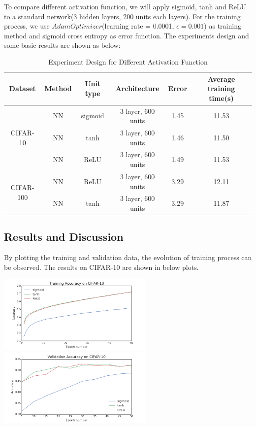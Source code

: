 \documentclass[]{article}
\begin{document}
To compare different activation function, we will apply sigmoid, tanh and ReLU to a standard network(3 hidden layers, 200 units each layers). For the training process, we use $AdamOptimizer$(learning rate = 0.0001, $\epsilon = 0.001$) as training method and sigmoid cross entropy as error function. The experiments design and some basic results are shown as below:
\begin{table}[!ht]
\centering 
\caption{Experiment Design for Different Activation Function}
\begin{tabular}{c c c c c c}
\toprule
Dataset & Method & Unit type & Architecture & Error & Average training time(s)  \\
\midrule
\multirow{3}{*}{CIFAR-10} & NN & sigmoid & 3 layer, 600 units & 1.45 & 11.53   \\
& NN & tanh & 3 layer, 600 units & 1.46 & 11.50   \\
& NN & ReLU & 3 layer, 600 units & 1.49 & 11.53   \\
\midrule
\multirow{3}{*}{CIFAR-100} & NN & ReLU & 3 layer, 600 units & 3.29 & 12.11 \\
& NN & tanh & 3 layer, 600 units & 3.29 & 11.87   \\
\bottomrule
\end{tabular}
\end{table}

\subsection{Results and Discussion}
By plotting the training and validation data, the evolution of training process can be observed. The results on CIFAR-10 are shown in below plots.

\includegraphics[width=3in]{activation_function_train_acc}
\includegraphics[width=3in]{activation_function_valid_acc}
\end{document}
